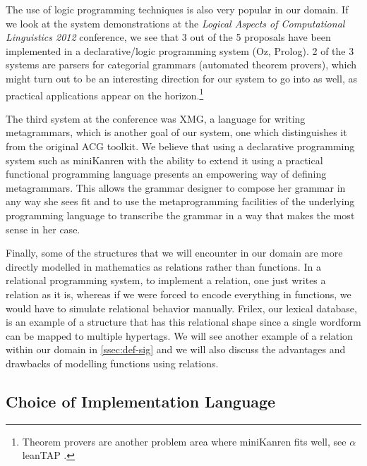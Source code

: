 The use of logic programming techniques is also very popular in our
domain. If we look at the system demonstrations at the \emph{Logical
  Aspects of Computational Linguistics 2012} conference, we see that 3
out of the 5 proposals have been implemented in a declarative/logic
programming system (Oz, Prolog). 2 of the 3 systems are parsers for
categorial grammars (automated theorem provers), which might turn out to
be an interesting direction for our system to go into as well, as
practical applications appear on the horizon.\footnote{Theorem provers
  are another problem area where miniKanren fits well, see
  $\alpha$leanTAP \cite{near2008alpha}.}

The third system at the conference was XMG, a language for writing
metagrammars, which is another goal of our system, one which
distinguishes it from the original ACG toolkit. We believe that using a
declarative programming system such as miniKanren with the ability to
extend it using a practical functional programming language presents an
empowering way of defining metagrammars. This allows the grammar
designer to compose her grammar in any way she sees fit and to use the
metaprogramming facilities of the underlying programming language to
transcribe the grammar in a way that makes the most sense in her case.

Finally, some of the structures that we will encounter in our domain are
more directly modelled in mathematics as relations rather than
functions. In a relational programming system, to implement a relation,
one just writes a relation as it is, whereas if we were forced to encode
everything in functions, we would have to simulate relational behavior
manually. Frilex, our lexical database, is an example of a structure
that has this relational shape since a single wordform can be mapped to
multiple hypertags. We will see another example of a relation within our
domain in \ref{ssec:def-sig} and we will also discuss the advantages and
drawbacks of modelling functions using relations.

\subsection{Choice of Implementation Language}

